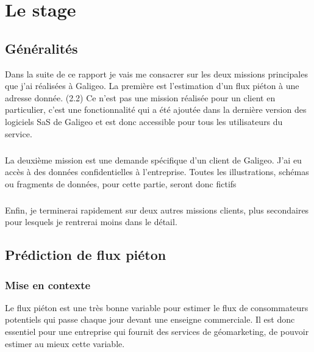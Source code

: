 \chapter[Le stage \ensg]{Le stage}

\section{Généralités}

Dans la suite de ce rapport je vais me consacrer sur les deux missions principales que j’ai réalisées à Galigeo. La première est l’estimation d’un flux piéton à une adresse donnée. (2.2) Ce n’est pas une mission réalisée pour un client en particulier, c’est une fonctionnalité qui a été ajoutée dans la dernière version des logiciels SaS de Galigeo et est donc accessible pour tous les utilisateurs du service.

\paragraph*{}

La deuxième mission est une demande spécifique d’un client de Galigeo. J’ai eu accès à des données confidentielles à l’entreprise. Toutes les illustrations, schémas ou fragments de données, pour cette partie, seront donc fictifs

\paragraph*{}

Enfin, je terminerai rapidement sur deux autres missions clients, plus secondaires pour lesquels je rentrerai moins dans le détail.


\section{Prédiction de flux piéton}

\subsection{Mise en contexte}

Le flux piéton est une très bonne variable pour estimer le flux de consommateurs potentiels qui passe chaque jour devant une enseigne commerciale. Il est donc essentiel pour une entreprise qui fournit des services de géomarketing, de pouvoir estimer au mieux cette variable.

\paragraph*{}


